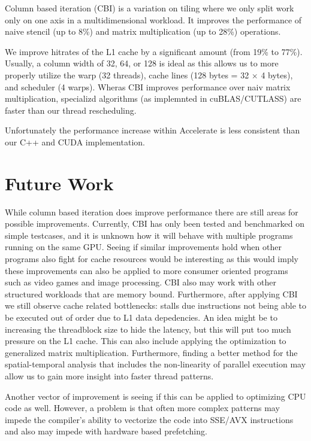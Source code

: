 Column based iteration (CBI) is a variation on tiling where we only split work only on one axis in a multidimensional workload. 
It improves the performance of naive stencil (up to 8\%) and matrix multiplication (up to 28\%) operations.

We improve hitrates of the L1 cache by a significant amount (from 19\% to 77\%).
Usually, a column width of 32, 64, or 128 is ideal as this allows us to more properly utilize the warp (32 threads), cache lines (128 bytes = 32 $\times$ 4 bytes), and scheduler (4 warps).
Wheras CBI improves performance over naiv matrix multiplication, specializd algorithms (as implemnted in cuBLAS/CUTLASS) are faster than our thread rescheduling.

Unfortunately the performance increase within Accelerate is less consistent than our C++ and CUDA implementation. 

\section{Future Work}
While column based iteration does improve performance there are still areas for possible improvements.
Currently, CBI has only been tested and benchmarked on simple testcases, and it is unknown how it will behave with multiple programs running on the same GPU.
Seeing if similar improvements hold when other programs also fight for cache resources would be interesting as this would imply these improvements can also be applied to more consumer oriented programs such as video games and image processing.
CBI also may work with other structured workloads that are memory bound.
Furthermore, after applying CBI we still observe cache related bottlenecks: stalls due instructions not being able to be executed out of order due to L1 data depedencies.
An idea might be to increasing the threadblock size to hide the latency, but this will put too much pressure on the L1 cache.
This can also include applying the optimization to generalized matrix multiplication.
Furthermore, finding a better method for the spatial-temporal analysis that includes the non-linearity of parallel execution may allow us to gain more insight into faster thread patterns.

Another vector of improvement is seeing if this can be applied to optimizing CPU code as well.
However, a problem is that often more complex patterns may impede the compiler's ability to vectorize the code into SSE/AVX instructions and also may impede with hardware based prefetching.
